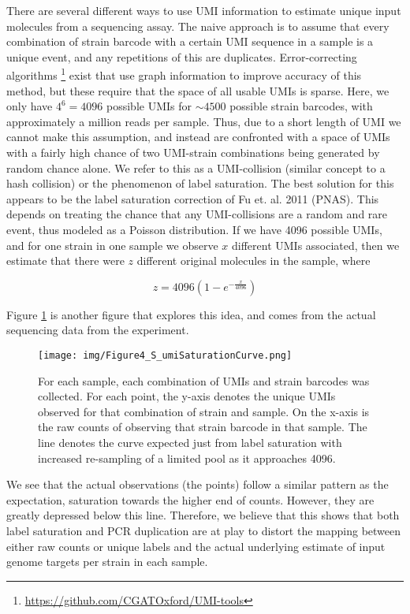 {There are several different ways to use UMI information to estimate
unique input molecules from a sequencing assay. The naive approach is to
assume that every combination of strain barcode with a certain UMI
sequence in a sample is a unique event, and any repetitions of this are
duplicates. Error-correcting algorithms \footnote{\url{https://github.com/CGATOxford/UMI-tools}}
exist that use graph information to improve accuracy of this method, but
these require that the space of all usable UMIs is sparse. Here, we only
have \(4^6=4096\) possible UMIs for \(\sim4500\) possible strain
barcodes, with approximately a million reads per sample. Thus, due to a
short length of UMI we cannot make this assumption, and instead are
confronted with a space of UMIs with a fairly high chance of two
UMI-strain combinations being generated by random chance alone. We refer
to this as a UMI-collision (similar concept to a hash collision) or the
phenomenon of label saturation. The best solution for this appears to be
the label saturation correction of Fu et. al. 2011 (PNAS). This depends
on treating the chance that any UMI-collisions are a random and rare
event, thus modeled as a Poisson distribution. If we have 4096 possible
UMIs, and for one strain in one sample we observe \(x\) different UMIs
associated, then we estimate that there were \(z\) different original
molecules in the sample, where

\[z=4096 (1-e^{-\frac{x}{4096}})\]

Figure \ref{fig:umi} is another figure that explores this idea, and
comes from the actual sequencing data from the experiment.

\begin{figure}[h!]
  \centering
  \texttt{[image: img/Figure4\_S\_umiSaturationCurve.png]}
  \caption{For each sample, 
    each combination of UMIs and strain barcodes was
    collected. For each point, the y-axis denotes the unique UMIs
    observed for that combination of strain and sample.
    On the x-axis is the raw counts of observing that strain barcode
    in that sample.
    The line denotes the curve expected just from label saturation
    with increased re-sampling of a limited pool as it approaches 4096. }
  \label{fig:umi}
\end{figure}

We see that the actual observations (the points) follow a similar
pattern as the expectation, saturation towards the higher end of counts.
However, they are greatly depressed below this line. Therefore, we
believe that this shows that both label saturation and PCR duplication
are at play to distort the mapping between either raw counts or unique
labels and the actual underlying estimate of input genome targets per
strain in each sample.

}
